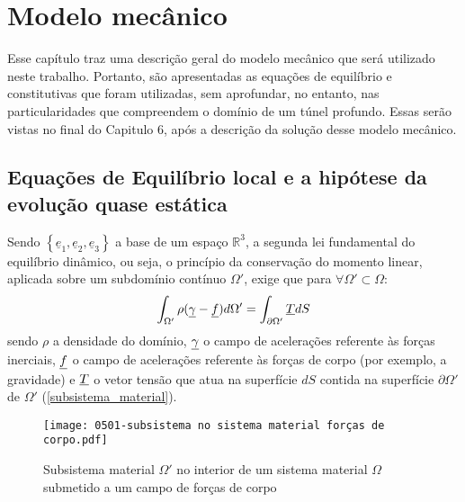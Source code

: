 \chapter{Modelo mecânico}
\label{cap: modelo mecanico}

Esse capítulo traz uma descrição geral do modelo mecânico que será utilizado neste trabalho. Portanto, são apresentadas as equações de equilíbrio e constitutivas que foram utilizadas, sem aprofundar, no entanto, nas particularidades que compreendem o domínio de um túnel profundo. Essas serão vistas no final do Capitulo 6, após a descrição da solução desse modelo mecânico. 

\section{Equações de Equilíbrio local e a hipótese da evolução quase estática}

Sendo $\left\{\underline{e}_1,\underline{e}_2,\underline{e}_3\right\}$ a base de um espaço $\mathbb{R}^3$, a segunda lei fundamental do equilíbrio dinâmico, ou seja, o princípio da conservação do momento linear, aplicada sobre um subdomínio contínuo $\Omega'$, exige que para $\forall \Omega' \subset \Omega$:
\begin{equation}
	\label{eq:conservacao_momento_linear}
\int_{\Omega'}\rho(\underline \gamma-\underline f)d\Omega' = \int_{\partial\Omega'}\underline T dS
\end{equation}
sendo $\rho$ a densidade do domínio, $\underline \gamma$ o campo de acelerações referente às forças inerciais, $\underline f$ o campo de acelerações referente às forças de corpo (por exemplo, a gravidade) e $\underline T$ o vetor tensão que atua na superfície $dS$ contida na superfície $\partial\Omega'$ de $\Omega'$ (\autoref{subsistema_material}).

\begin{figure}[H]
	\begin{center}
		\texttt{[image: 0501-subsistema no sistema material forças de corpo.pdf]}
	\end{center}
	\caption{\label{subsistema_material}Subsistema material $\Omega'$ no interior de um sistema material $\Omega$ submetido a um campo de forças de corpo}
\end{figure}

